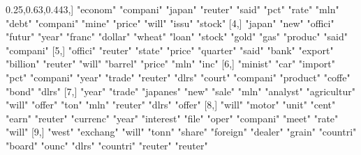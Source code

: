 \documentclass[
]{article}
\newenvironment{Shaded}{}{}
\newcommand{\DecValTok}[1]{\textcolor[rgb]{0.25,0.63,0.44}{#1}}
\newcommand{\NormalTok}[1]{#1}
\newcommand{\StringTok}[1]{\textcolor[rgb]{0.25,0.44,0.63}{#1}}
\begin{document}
\begin{Shaded}
\begin{Highlighting}[]
\NormalTok{ [}\DecValTok{3}\NormalTok{,] }\StringTok{"econom"}  \StringTok{"compani"} \StringTok{"japan"}   \StringTok{"reuter"}   \StringTok{"said"}    \StringTok{"pct"}     \StringTok{"rate"}    \StringTok{"mln"}        \StringTok{"debt"}     \StringTok{"compani"} \StringTok{"mine"}    \StringTok{"price"}   \StringTok{"will"}    \StringTok{"issu"}   \StringTok{"stock"}  
\NormalTok{ [}\DecValTok{4}\NormalTok{,] }\StringTok{"japan"}   \StringTok{"new"}     \StringTok{"offici"}  \StringTok{"futur"}    \StringTok{"year"}    \StringTok{"franc"}   \StringTok{"dollar"}  \StringTok{"wheat"}      \StringTok{"loan"}     \StringTok{"stock"}   \StringTok{"gold"}    \StringTok{"gas"}     \StringTok{"produc"}  \StringTok{"said"}   \StringTok{"compani"}
\NormalTok{ [}\DecValTok{5}\NormalTok{,] }\StringTok{"offici"}  \StringTok{"reuter"}  \StringTok{"state"}   \StringTok{"price"}    \StringTok{"quarter"} \StringTok{"said"}    \StringTok{"bank"}    \StringTok{"export"}     \StringTok{"billion"}  \StringTok{"reuter"}  \StringTok{"will"}    \StringTok{"barrel"}  \StringTok{"price"}   \StringTok{"mln"}    \StringTok{"inc"}    
\NormalTok{ [}\DecValTok{6}\NormalTok{,] }\StringTok{"minist"}  \StringTok{"car"}     \StringTok{"import"}  \StringTok{"pct"}      \StringTok{"compani"} \StringTok{"year"}    \StringTok{"trade"}   \StringTok{"reuter"}     \StringTok{"dlrs"}     \StringTok{"court"}   \StringTok{"compani"} \StringTok{"product"} \StringTok{"coffe"}   \StringTok{"bond"}   \StringTok{"dlrs"}   
\NormalTok{ [}\DecValTok{7}\NormalTok{,] }\StringTok{"year"}    \StringTok{"trade"}   \StringTok{"japanes"} \StringTok{"new"}      \StringTok{"sale"}    \StringTok{"mln"}     \StringTok{"analyst"} \StringTok{"agricultur"} \StringTok{"will"}     \StringTok{"offer"}   \StringTok{"ton"}     \StringTok{"mln"}     \StringTok{"reuter"}  \StringTok{"dlrs"}   \StringTok{"offer"}  
\NormalTok{ [}\DecValTok{8}\NormalTok{,] }\StringTok{"will"}    \StringTok{"motor"}   \StringTok{"unit"}    \StringTok{"cent"}     \StringTok{"earn"}    \StringTok{"reuter"}  \StringTok{"currenc"} \StringTok{"year"}       \StringTok{"interest"} \StringTok{"file"}    \StringTok{"oper"}    \StringTok{"compani"} \StringTok{"meet"}    \StringTok{"rate"}   \StringTok{"will"}   
\NormalTok{ [}\DecValTok{9}\NormalTok{,] }\StringTok{"west"}    \StringTok{"exchang"} \StringTok{"will"}    \StringTok{"tonn"}     \StringTok{"share"}   \StringTok{"foreign"} \StringTok{"dealer"}  \StringTok{"grain"}      \StringTok{"countri"}  \StringTok{"board"}   \StringTok{"ounc"}    \StringTok{"dlrs"}    \StringTok{"countri"} \StringTok{"reuter"} \StringTok{"reuter"} 

\end{Highlighting}
\end{Shaded}
\end{document}

